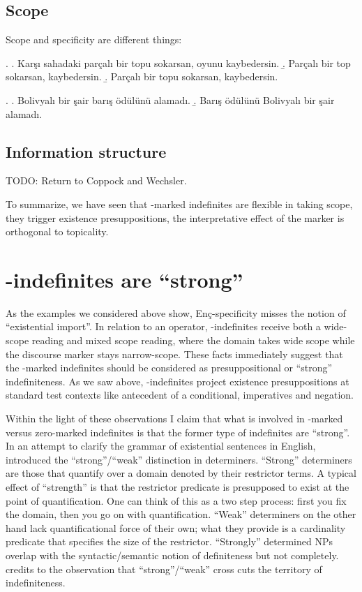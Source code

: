 \documentclass[11pt,a4paper]{article}
\newcommand{\encspec}{Enç-specific}
\begin{document}
\subsection{Scope}

Scope and specificity are different things:

\ex.
\a. Karşı sahadaki parçalı bir topu sokarsan, oyunu kaybedersin.
\b. Parçalı bir top sokarsan, kaybedersin.
\b. Parçalı bir topu sokarsan, kaybedersin.


\ex.
\a. Bolivyalı bir şair barış ödülünü alamadı.
\b. Barış ödülünü Bolivyalı bir şair alamadı. 

\subsection{Information structure}

TODO: Return to Coppock and Wechsler.



To summarize, we have seen that \acc-marked indefinites are flexible in taking scope, they trigger existence presuppositions, the interpretative effect of the marker is orthogonal to topicality.


\section{\acc-indefinites are ``strong''}
\label{scstrong}

As the examples we considered above show, \encspec ity misses the notion of
``existential import''.  In relation to an operator, \acc-indefinites receive
both a wide-scope reading and mixed scope reading, where the domain takes wide
scope while the discourse marker stays narrow-scope.  These facts immediately
suggest that the \acc-marked indefinites should be considered as
presuppositional or ``strong'' indefiniteness.  As we saw above,
\acc-indefinites project existence presuppositions at standard test contexts
like antecedent of a conditional, imperatives and negation. 

Within the light of these observations I claim that what is involved in
\acc-marked versus zero-marked indefinites is that the former type of
indefinites are ``strong''.  In an attempt to clarify the grammar of
existential sentences in English, \cite{milsark77} introduced the
``strong''/``weak'' distinction in determiners. ``Strong'' determiners are
those that quantify over a domain denoted by their restrictor terms. A typical
effect of ``strength'' is that the restrictor predicate is presupposed to exist
at the point of quantification. One can think of this as a two step process:
first you fix the domain, then you go on with quantification. ``Weak''
determiners on the other hand lack quantificational force of their own; what
they provide is a cardinality predicate that specifies the size of the
restrictor. ``Strongly'' determined NPs overlap with the syntactic/semantic
notion of definiteness but not completely.  credits to
 the observation that ``strong''/``weak'' cross cuts the
territory of indefiniteness. 
\end{document}

